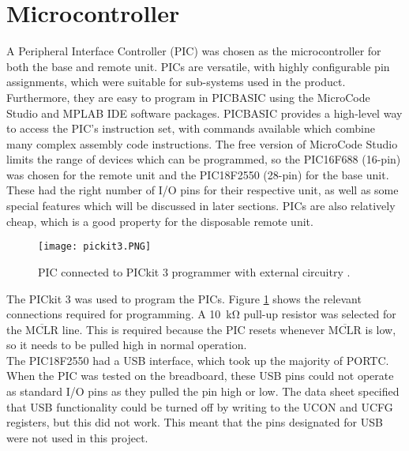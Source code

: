\section{Microcontroller}
A Peripheral Interface Controller (PIC) was chosen as the microcontroller for both the base and remote unit. PICs are versatile, with highly configurable pin assignments, which were suitable for sub-systems used in the product. Furthermore, they are easy to program in PICBASIC using the MicroCode Studio \cite{microcode_studio} and MPLAB IDE software packages. PICBASIC provides a high-level way to access the PIC's instruction set, with commands available which combine many complex assembly code instructions. The free version of MicroCode Studio limits the range of devices which can be programmed, so the PIC16F688 (16-pin) \cite{pic16f688} was chosen for the remote unit and the PIC18F2550 (28-pin) \cite{pic18f2550} for the base unit. These had the right number of I/O pins for their respective unit, as well as some special features which will be discussed in later sections. PICs are also relatively cheap, which is a good property for the disposable remote unit.\\

\begin{figure}[htbp]
	\centering
	\texttt{[image: pickit3.PNG]}
	\caption{PIC connected to PICkit 3 programmer with external circuitry \cite{pickit3}.}
	\label{fig: pickit3}
\end{figure}

The PICkit 3 \cite{pickit3} was used to program the PICs. Figure \ref{fig: pickit3} shows the relevant connections required for programming. A \SI{10}{\kilo\ohm} pull-up resistor was selected for the $\overline{\text{MCLR}}$ line. This is required because the PIC resets whenever $\overline{\text{MCLR}}$ is low, so it needs to be pulled high in normal operation. \\

The PIC18F2550 had a USB interface, which took up the majority of PORTC. When the PIC was tested on the breadboard, these USB pins could not operate as standard I/O pins as they pulled the pin high or low. The data sheet specified that USB functionality could be turned off by writing to the UCON and UCFG registers, but this did not work. This meant that the pins designated for USB were not used in this project.\\
